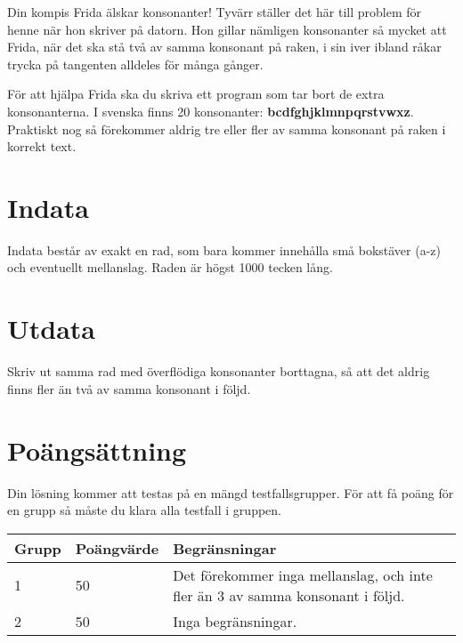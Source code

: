 Din kompis Frida älskar konsonanter! Tyvärr ställer det här till problem för henne när hon skriver på datorn. Hon gillar nämligen konsonanter så mycket att Frida, när det ska stå två av samma konsonant på raken, i sin iver ibland råkar trycka på tangenten alldeles för många gånger.

För att hjälpa Frida ska du skriva ett program som tar bort de extra konsonanterna. I svenska finns 20 konsonanter: \textbf{bcdfghjklmnpqrstvwxz}. Praktiskt nog så förekommer aldrig tre eller fler av samma konsonant på raken i korrekt text.

\section*{Indata}
Indata består av exakt en rad, som bara kommer innehålla små bokstäver (a-z) och eventuellt mellanslag. Raden är högst 1000 tecken lång.

\section*{Utdata}
Skriv ut samma rad med överflödiga konsonanter borttagna, så att det aldrig finns fler än två av samma konsonant i följd.

\section*{Poängsättning}
Din lösning kommer att testas på en mängd testfallsgrupper.
För att få poäng för en grupp så måste du klara alla testfall i gruppen.

\noindent
\begin{tabular}{| l | l | l |}
\hline
Grupp & Poängvärde & Begränsningar \\ \hline
1     & 50          &  Det förekommer inga mellanslag, och inte fler än 3 av samma konsonant i följd.\\ \hline
2     & 50         &  Inga begränsningar. \\ \hline
\end{tabular}

